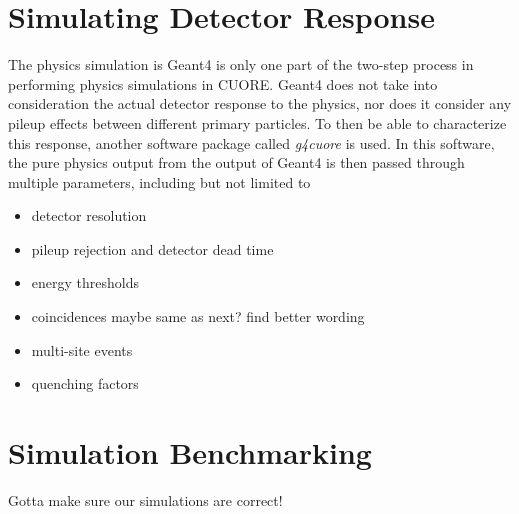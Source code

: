\section{Simulating Detector Response}
The physics simulation is Geant4 is only one part of the two-step process in performing physics simulations in CUORE.
Geant4 does not take into consideration the actual detector response to the physics, nor does it consider any pileup effects between different primary particles.
To then be able to characterize this response, another software package called \textit{g4cuore} is used.
In this software, the pure physics output from the output of Geant4 is then passed through multiple parameters, including but not limited to
\begin{itemize}
    \item detector resolution
    \item pileup rejection and detector dead time
    \item energy thresholds
    \item coincidences \color{red} maybe same as next? find better wording \color{black}
    \item multi-site events
    \item quenching factors
\end{itemize}

\section{Simulation Benchmarking}

Gotta make sure our simulations are correct!
